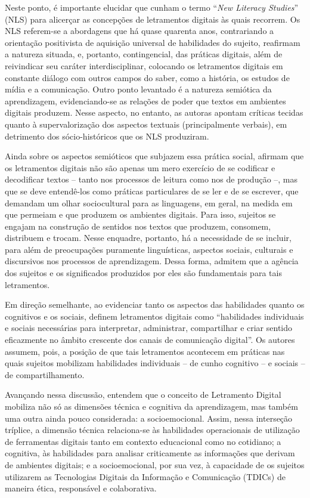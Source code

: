 \documentclass[portuguese]{textolivre}
\begin{document}
Neste ponto, é importante elucidar que \textcite{gourlay_textual_2014} cunham o termo “\textit{New Literacy Studies}” (NLS) para alicerçar as concepções de letramentos digitais às quais recorrem. Os NLS referem-se a abordagens que há quase quarenta anos, contrariando a orientação positivista de aquisição universal de habilidades do sujeito, reafirmam a natureza situada, e, portanto, contingencial, das práticas digitais, além de reivindicar seu caráter interdisciplinar, colocando os letramentos digitais em constante diálogo com outros campos do saber, como a história, os estudos de mídia e a comunicação. Outro ponto levantado é a natureza semiótica da aprendizagem, evidenciando-se as relações de poder que textos em ambientes digitais produzem. Nesse aspecto, no entanto, as autoras apontam críticas tecidas quanto à supervalorização dos aspectos textuais (principalmente verbais), em detrimento dos sócio-históricos que os NLS produziram.

Ainda sobre os aspectos semióticos que subjazem essa prática social, \textcite[p.~5]{lankshear_digital_2008} afirmam que os letramentos digitais não são apenas um mero exercício de se codificar e decodificar textos – tanto nos processos de leitura como nos de produção –, mas que se deve entendê-los como práticas particulares de se ler e de se escrever, que demandam um olhar sociocultural para as linguagens, em geral, na medida em que permeiam e que produzem os ambientes digitais. Para isso, sujeitos se engajam na construção de sentidos nos textos que produzem, consomem, distribuem e trocam. Nesse enquadre, portanto, há a necessidade de se incluir, para além de preocupações puramente linguísticas, aspectos sociais, culturais e discursivos nos processos de aprendizagem. Dessa forma, \textcite{lankshear_digital_2008} admitem que a agência dos sujeitos e os significados produzidos por eles são fundamentais para tais letramentos.

Em direção semelhante, ao evidenciar tanto os aspectos das habilidades quanto os cognitivos e os sociais, \textcite[p.~17]{dudeney_letramentos_2016} definem letramentos digitais como “habilidades individuais e sociais necessárias para interpretar, administrar, compartilhar e criar sentido eficazmente no âmbito crescente dos canais de comunicação digital”. Os autores assumem, pois, a posição de que tais letramentos acontecem em práticas nas quais sujeitos mobilizam habilidades individuais – de cunho cognitivo – e sociais – de compartilhamento.

Avançando nessa discussão, \textcite{list_framework_2020} entendem que o conceito de Letramento Digital mobiliza não só as dimensões técnica e cognitiva da aprendizagem, mas também uma outra ainda pouco considerada: a socioemocional. Assim, nessa interseção tríplice, a dimensão técnica relaciona-se às habilidades operacionais de utilização de ferramentas digitais tanto em contexto educacional como no cotidiano; a cognitiva, às habilidades para analisar criticamente as informações que derivam de ambientes digitais; e a socioemocional, por sua vez, à capacidade de os sujeitos utilizarem as Tecnologias Digitais da Informação e Comunicação (TDICs) de maneira ética, responsável e colaborativa.
\end{document}
